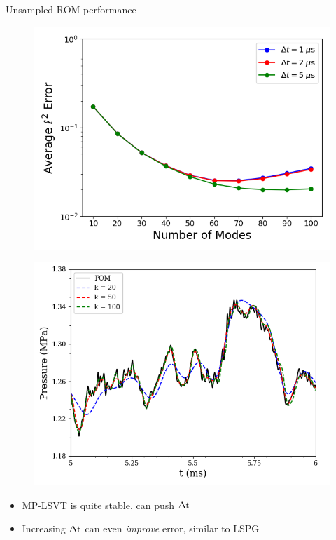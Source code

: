 \documentclass[]{beamer}
\begin{document}
\begin{frame}{Unsampled ROM performance}
	\begin{minipage}{0.49\linewidth}
		\begin{figure}
			\includegraphics[width=0.99\linewidth]{experiments/box/timeStepModeStudy_Average_errorRaw.png}
		\end{figure}
	\end{minipage}
	\begin{minipage}{0.49\linewidth}
		\begin{figure}
			\includegraphics[width=0.99\linewidth]{experiments/box/point_1_Static_Pressure_modeStudy.png}
		\end{figure}
	\end{minipage}
	\vspace{1em}
	\begin{itemize}
		\item MP-LSVT is quite stable, can push $\Delta \text{t}$
		\item Increasing $\Delta \text{t}$ can even \textit{improve} error, similar to LSPG
	\end{itemize}
\end{frame}
\end{document}
